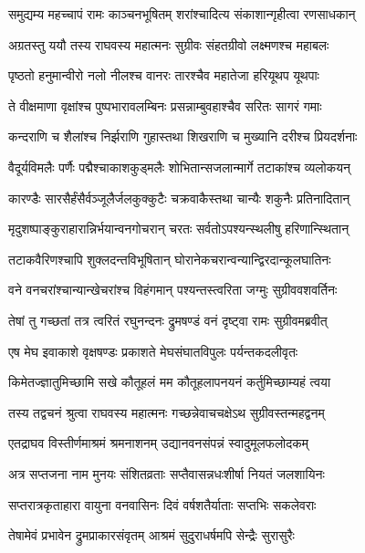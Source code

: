 \twolineshloka
{समुद्यम्य महच्चापं रामः काञ्चनभूषितम्}
{शरांश्चादित्य संकाशान्गृहीत्वा रणसाधकान्} %

\twolineshloka
{अग्रतस्तु ययौ तस्य राघवस्य महात्मनः}
{सुग्रीवः संहतग्रीवो लक्ष्मणश्च महाबलः} %

\twolineshloka
{पृष्ठतो हनुमान्वीरो नलो नीलश्च वानरः}
{तारश्चैव महातेजा हरियूथप यूथपाः} %

\twolineshloka
{ते वीक्षमाणा वृक्षांश्च पुष्पभारावलम्बिनः}
{प्रसन्नाम्बुवहाश्चैव सरितः सागरं गमाः} %

\twolineshloka
{कन्दराणि च शैलांश्च निर्झराणि गुहास्तथा}
{शिखराणि च मुख्यानि दरीश्च प्रियदर्शनाः} %

\twolineshloka
{वैदूर्यविमलैः पर्णैः पद्मैश्चाकाशकुड्मलैः}
{शोभितान्सजलान्मार्गे तटाकांश्च व्यलोकयन्} %

\twolineshloka
{कारण्डैः सारसैर्हंसैर्वञ्जूलैर्जलकुक्कुटैः}
{चक्रवाकैस्तथा चान्यैः शकुनैः प्रतिनादितान्} %

\twolineshloka
{मृदुशष्पाङ्कुराहारान्निर्भयान्वनगोचरान्}
{चरतः सर्वतोऽपश्यन्स्थलीषु हरिणान्स्थितान्} %

\twolineshloka
{तटाकवैरिणश्चापि शुक्लदन्तविभूषितान्}
{घोरानेकचरान्वन्यान्द्विरदान्कूलघातिनः} %

\twolineshloka
{वने वनचरांश्चान्यान्खेचरांश्च विहंगमान्}
{पश्यन्तस्त्वरिता जग्मुः सुग्रीववशवर्तिनः} %

\twolineshloka
{तेषां तु गच्छतां तत्र त्वरितं रघुनन्दनः}
{द्रुमषण्डं वनं दृष्ट्वा रामः सुग्रीवमब्रवीत्} %

\twolineshloka
{एष मेघ इवाकाशे वृक्षषण्डः प्रकाशते}
{मेघसंघातविपुलः पर्यन्तकदलीवृतः} %

\twolineshloka
{किमेतज्ज्ञातुमिच्छामि सखे कौतूहलं मम}
{कौतूहलापनयनं कर्तुमिच्छाम्यहं त्वया} %

\twolineshloka
{तस्य तद्वचनं श्रुत्वा राघवस्य महात्मनः}
{गच्छन्नेवाचचक्षेऽथ सुग्रीवस्तन्महद्वनम्} %

\twolineshloka
{एतद्राघव विस्तीर्णमाश्रमं श्रमनाशनम्}
{उद्यानवनसंपन्नं स्वादुमूलफलोदकम्} %

\twolineshloka
{अत्र सप्तजना नाम मुनयः संशितव्रताः}
{सप्तैवासन्नधःशीर्षा नियतं जलशायिनः} %

\twolineshloka
{सप्तरात्रकृताहारा वायुना वनवासिनः}
{दिवं वर्षशतैर्याताः सप्तभिः सकलेवराः} %

\twolineshloka
{तेषामेवं प्रभावेन द्रुमप्राकारसंवृतम्}
{आश्रमं सुदुराधर्षमपि सेन्द्रैः सुरासुरैः} %


